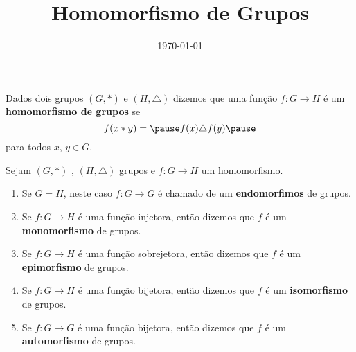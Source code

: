 \documentclass{beamer}
\title{Homomorfismo de Grupos}
\author[\autor]{\autor}
\institute[\instituto]{\instituto}
\date{\today}
\begin{document}
    \begin{frame}
        \maketitle
    \end{frame}


    \begin{frame}
        \begin{definicao}
            Dados dois grupos $(G, *)$ \pause e $(H,\triangle)$ \pause dizemos que uma fun\c{c}\~ao $f : G \to H$ \pause \'e um \textbf{homomorfismo de grupos} se \pause
            \[
                f(x * y) = \pause f(x)\triangle f(y) \pause
            \]
            para todos $x$, $y \in G$.
        \end{definicao}
    \end{frame}

    \begin{frame}
        \begin{observacao}
            Sejam $(G, *)$ \pause, $(H, \triangle)$ grupos \pause e $f : G \to H$ um homomorfismo. \pause
            \begin{enumerate}[label={\arabic*})]
                \item Se $G = H$, \pause neste caso $f : G \to G$ \pause \'e chamado de um \textbf{endomorfimos} de grupos.\pause
                \item Se $f : G \to H$ \'e uma fun\c{c}\~ao injetora, \pause ent\~ao dizemos que $f$ \'e um \textbf{monomorfismo} de grupos.\pause
                \item Se $f : G \to H$ \'e uma fun\c{c}\~ao sobrejetora, \pause ent\~ao dizemos que $f$ \'e um \textbf{epimorfismo} de grupos.\pause
                \item Se $f : G \to H$ \'e uma fun\c{c}\~ao bijetora, \pause ent\~ao dizemos que $f$ \'e um \textbf{isomorfismo} de grupos.\pause
                \item Se $f : G \to G$ \'e uma fun\c{c}\~ao bijetora, \pause ent\~ao dizemos que $f$ \'e um \textbf{automorfismo} de grupos.
            \end{enumerate}
        \end{observacao}
    \end{frame}
\end{document}
